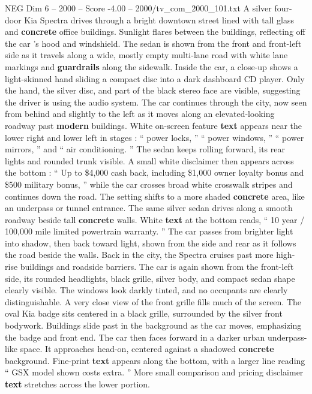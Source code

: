 \begin{textsample}{NEG Dim 6 – 2000 – Score -4.00 – 2000/tv\_com\_2000\_101.txt}  \label{ex:f6_neg_041}
A silver four-door Kia Spectra drives through a bright downtown street lined with tall glass and \textbf{concrete} office buildings.
Sunlight flares between the buildings, reflecting off the car ’s hood and windshield.
The sedan is shown from the front and front-left side as it travels along a wide, mostly empty multi-lane road with white lane markings and \textbf{guardrails} along the sidewalk.
Inside the car, a close-up shows a light-skinned hand sliding a compact disc into a dark dashboard CD player.
Only the hand, the silver disc, and part of the black stereo face are visible, suggesting the driver is using the audio system.
The car continues through the city, now seen from behind and slightly to the left as it moves along an elevated-looking roadway past \textbf{modern} buildings.
White on-screen feature \textbf{text} appears near the lower right and lower left in stages : “ power locks, ” “ power windows, ” “ power mirrors, ” and “ air conditioning. ” The sedan keeps rolling forward, its rear lights and rounded trunk visible.
A small white disclaimer then appears across the bottom : “ Up to \$4,000 cash back, including \$1,000 owner loyalty bonus and \$500 military bonus, ” while the car crosses broad white crosswalk stripes and continues down the road.
The setting shifts to a more shaded \textbf{concrete} area, like an underpass or tunnel entrance.
The same silver sedan drives along a smooth roadway beside tall \textbf{concrete} walls.
White \textbf{text} at the bottom reads, “ 10 year / 100,000 mile limited powertrain warranty. ” The car passes from brighter light into shadow, then back toward light, shown from the side and rear as it follows the road beside the walls.
Back in the city, the Spectra cruises past more high-rise buildings and roadside barriers.
The car is again shown from the front-left side, its rounded headlights, black grille, silver body, and compact sedan shape clearly visible.
The windows look darkly tinted, and no occupants are clearly distinguishable.
A very close view of the front grille fills much of the screen.
The oval Kia badge sits centered in a black grille, surrounded by the silver front bodywork.
Buildings slide past in the background as the car moves, emphasizing the badge and front end.
The car then faces forward in a darker urban underpass-like space.
It approaches head-on, centered against a shadowed \textbf{concrete} background.
Fine-print \textbf{text} appears along the bottom, with a larger line reading “ GSX model shown costs extra. ” More small comparison and pricing disclaimer \textbf{text} stretches across the lower portion.

\end{textsample}
